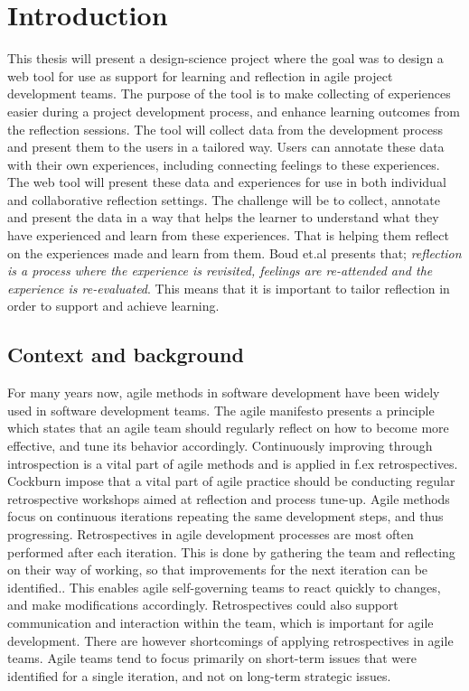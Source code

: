 \chapter{Introduction}
This thesis will present a design-science project where the goal was to design a web tool for use as support for learning and reflection in agile project development teams. The purpose of the tool is to make collecting of experiences easier during a project development process, and enhance learning outcomes from the reflection sessions. The tool will collect data from the development process and present them to the users in a tailored way. Users can annotate these data with their own experiences, including connecting feelings to these experiences. The web tool will present these data and experiences for use in both individual and collaborative reflection settings. The challenge will be to collect, annotate and present the data in a way that helps the learner to understand what they have experienced and learn from these experiences. That is helping them reflect on the experiences made and learn from them. Boud et.al\cite{boudreflection1985} presents that; \emph{reflection is a process where the experience is revisited, feelings are re-attended and the experience is re-evaluated}. This means that it is important to tailor reflection in order to support and achieve learning.

\section{Context and background}
For many years now, agile methods in software development have been widely used in software development teams. The agile manifesto presents a principle which states that an agile team should regularly reflect on how to become more effective, and tune its behavior accordingly\cite{Beck2001}. Continuously improving through introspection is a vital part of agile methods and is applied in f.ex retrospectives\cite{Beck1999, Derby2006, Maham2008}. Cockburn impose that a vital part of agile practice should be conducting regular retrospective workshops aimed at reflection and process tune-up\cite{Cockburn2006}. Agile methods focus on continuous iterations repeating the same development steps, and thus progressing. Retrospectives in agile development processes are most often performed after each iteration. This is done by gathering the team and reflecting on their way of working, so that improvements for the next iteration can be identified.\cite{Derby2006, Drury2011}. This enables agile self-governing teams to react quickly to changes, and make modifications accordingly\cite{Drury2011}. Retrospectives could also support communication and interaction within the team, which is important for agile development. There are however shortcomings of applying retrospectives in agile teams. Agile teams tend to focus primarily on short-term issues that were identified for a single iteration, and not on long-term strategic issues\cite{Drury2011}. 

